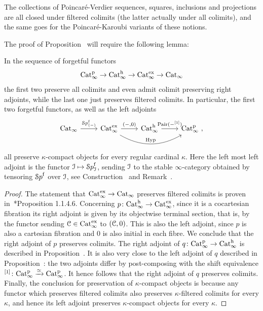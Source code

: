 \begin{corollary}
The collections of Poincaré-Verdier sequences, squares, inclusions and projections are all closed under filtered colimits (the latter actually under all colimits), and the same goes for the Poincaré-Karoubi variants of these notions.
\end{corollary}


The proof of Proposition~ will require the following lemma:

\begin{lemma}
\label{lemma:hyp-U-preserve-compact}%
In the sequence of forgetful functors
\[
\mathrm{Cat}^{\mathrm p}_\infty \to \mathrm{Cat}^\mathrm{h}_\infty \to \mathrm{Cat}_\infty^{\mathrm{ex}} \to \mathrm{Cat}_\infty
\]
the first two preserve all colimits and even admit colimit preserving right adjoints, 
while the last one just preserves filtered colimits. In particular, the first two forgetful functors, 
as well as the left adjoints
\[
\begin{tikzcd}
\Cat \ar[r,"{\Spaf_{(-)}}"] & \Catx \ar[rr,bend right, "\Hyp"] \ar[r,"{(-,0)}"] & \Cath \ar[r,"\Pairings(-\qshift{1})"] & \Catp \ ,
\end{tikzcd}
\]
all preserve $\kappa$-compact objects for every regular cardinal $\kappa$. Here the left most left adjoint is the functor $\mathcal{I} \mapsto {\mathcal Sp}^{\mathrm{f}}_{\mathcal{I}}$, sending $\mathcal{I}$ to the stable $\infty$-category obtained by tensoring ${\mathcal Sp}^{\mathrm{f}}$ over $\mathcal{I}$, see Construction~ and Remark~. 
\end{lemma}
\begin{proof}
The statement that $\mathrm{Cat}_\infty^{\mathrm{ex}} \to \mathrm{Cat}_\infty$ preserves filtered colimits is proven in~\cite{HA}*{Proposition 1.1.4.6}. 
Concerning $p\colon \mathrm{Cat}^\mathrm{h}_\infty \to \mathrm{Cat}_\infty^{\mathrm{ex}}$, since it is a cocartesian fibration its right adjoint is given by its objectwise terminal section, that is, by the functor sending $\mathcal C \in \mathrm{Cat}_\infty^{\mathrm{ex}}$ to $(\mathcal C,0)$. This is also the left adjoint, since $p$ is also a cartesian fibration and $0$ is also initial in each fibre. We conclude that the right adjoint of $p$ preserves colimits. The right adjoint of $q\colon \mathrm{Cat}^{\mathrm p}_\infty \to \mathrm{Cat}^\mathrm{h}_\infty$ is described in Proposition~. It is also very close to the left adjoint of $q$ described in Proposition~: the two adjoints differ by post-composing with the shift equivalence $^{[1]}\colon \mathrm{Cat}^{\mathrm p}_\infty \xrightarrow{\simeq} \mathrm{Cat}^{\mathrm p}_\infty$. It hence follows that the right adjoint of $q$ preserves colimits. Finally, the conclusion for preservation of $\kappa$-compact objects is because any functor which preserves filtered colimits also preserves $\kappa$-filtered colimits for every $\kappa$, and hence its left adjoint preserves $\kappa$-compact objects for every $\kappa$.
\end{proof}

